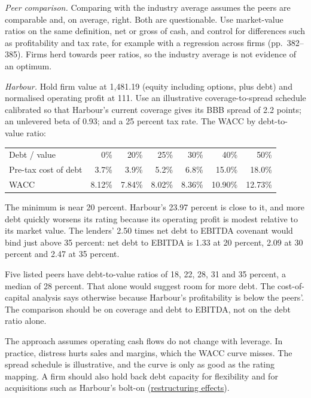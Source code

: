 \begin{qfmethod}
\emph{Peer comparison.} Comparing with the industry average assumes the peers are comparable and, on average, right. Both are questionable. Use market-value ratios on the same definition, net or gross of cash, and control for differences such as profitability and tax rate, for example with a regression across firms (pp.~382--385). Firms herd towards peer ratios, so the industry average is not evidence of an optimum.

 \emph{Harbour.} Hold firm value at 1,481.19 (equity including options, plus debt) and normalised operating profit at 111. Use an illustrative coverage-to-spread schedule calibrated so that Harbour's current coverage gives its BBB spread of 2.2 points; an unlevered beta of 0.93; and a 25 percent tax rate. The WACC by debt-to-value ratio:

\begin{center}\small
\begin{tabular}{@{}lrrrrrr@{}}
\toprule
Debt / value & 0\% & 20\% & 25\% & 30\% & 40\% & 50\% \\
Pre-tax cost of debt & 3.7\% & 3.9\% & 5.2\% & 6.8\% & 15.0\% & 18.0\% \\
WACC & 8.12\% & 7.84\% & 8.02\% & 8.36\% & 10.90\% & 12.73\% \\
\bottomrule
\end{tabular}
\end{center}

The minimum is near 20 percent. Harbour's 23.97 percent is close to it, and more debt quickly worsens its rating because its operating profit is modest relative to its market value. The lenders' 2.50 times net debt to EBITDA covenant would bind just above 35 percent: net debt to EBITDA is 1.33 at 20 percent, 2.09 at 30 percent and 2.47 at 35 percent.

Five listed peers have debt-to-value ratios of 18, 22, 28, 31 and 35 percent, a median of 28 percent. That alone would suggest room for more debt. The cost-of-capital analysis says otherwise because Harbour's profitability is below the peers'. The comparison should be on coverage and debt to EBITDA, not on the debt ratio alone.

 The approach assumes operating cash flows do not change with leverage. In practice, distress hurts sales and margins, which the WACC curve misses. The spread schedule is illustrative, and the curve is only as good as the rating mapping. A firm should also hold back debt capacity for flexibility and for acquisitions such as Harbour's bolt-on (\hyperref[ex:restructuring-valuation-effects]{restructuring effects}).


\end{qfmethod}
